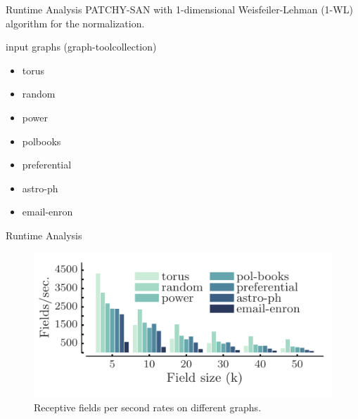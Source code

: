 \documentclass[dvipdfmx]{beamer}
\begin{document}
  \begin{frame}{Runtime Analysis}
    PATCHY-SAN with 1-dimensional Weisfeiler-Lehman (1-WL) algorithm for the normalization.
    \vspace{5mm}

    \begin{block}{input graphs (graph-tool\footnotemark collection)}
      \begin{itemize}
        \item torus
        \item random
        \item power
        \item polbooks
        \item preferential
        \item astro-ph
        \item email-enron
      \end{itemize}
    \end{block}
  \end{frame}

  \begin{frame}{Runtime Analysis}
    \begin{figure}[h]
      \centering
      \includegraphics[width=0.8\paperwidth]{img/Fig4.pdf}
      \caption{Receptive fields per second rates on different graphs.}
    \end{figure} 
  \end{frame}
\end{document}
